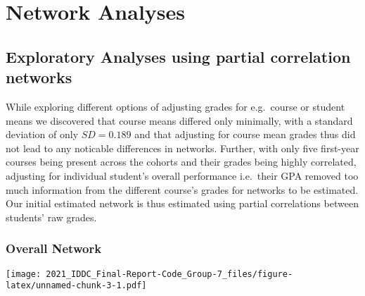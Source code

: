 \documentclass[
]{article}
\newenvironment{Shaded}{\begin{snugshade}}{\end{snugshade}}
\newcommand{\DataTypeTok}[1]{\textcolor[rgb]{0.13,0.29,0.53}{#1}}
\newcommand{\DecValTok}[1]{\textcolor[rgb]{0.00,0.00,0.81}{#1}}
\newcommand{\KeywordTok}[1]{\textcolor[rgb]{0.13,0.29,0.53}{\textbf{#1}}}
\newcommand{\NormalTok}[1]{#1}
\newcommand{\OperatorTok}[1]{\textcolor[rgb]{0.81,0.36,0.00}{\textbf{#1}}}
\newcommand{\StringTok}[1]{\textcolor[rgb]{0.31,0.60,0.02}{#1}}
\begin{document}
\hypertarget{network-analyses}{%
\section{Network Analyses}\label{network-analyses}}

\hypertarget{exploratory-analyses-using-partial-correlation-networks}{%
\subsection{Exploratory Analyses using partial correlation
networks}\label{exploratory-analyses-using-partial-correlation-networks}}

While exploring different options of adjusting grades for e.g.~course or
student means we discovered that course means differed only minimally,
with a standard deviation of only \(SD = 0.189\) and that adjusting for
course mean grades thus did not lead to any noticable differences in
networks. Further, with only five first-year courses being present
across the cohorts and their grades being highly correlated, adjusting
for individual student's overall performance i.e.~their GPA removed too
much information from the different course's grades for networks to be
estimated. Our initial estimated network is thus estimated using partial
correlations between students' raw grades.

\hypertarget{overall-network}{%
\subsubsection{Overall Network}\label{overall-network}}

\begin{Shaded}
\end{Shaded}

\texttt{[image: 2021\_IDDC\_Final-Report-Code\_Group-7\_files/figure-latex/unnamed-chunk-3-1.pdf]}
\end{document}
